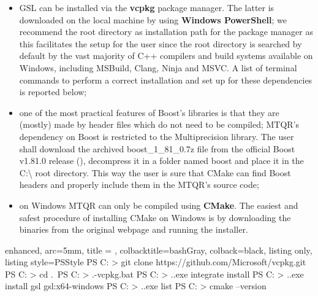 \documentclass[a4paper, twosided]{book}
\begin{document}
\begin{itemize}
    \item GSL can be installed via the \color{poliDarkBlue} \textbf{vcpkg} \color{black} package manager. The latter is downloaded on the local machine by using \color{poliDarkBlue} \textbf{Windows PowerShell}\color{black}; we recommend the root directory as installation path for the package manager as this facilitates the setup for the user since the root directory is searched by default by the vast majority of C++ compilers and build systems available on Windows, including MSBuild, Clang, Ninja and MSVC. A list of terminal commands to perform a correct installation and set up for these dependencies is reported below;

    \item one of the most practical features of Boost's libraries is that they are (mostly) made by header files which do not need to be compiled; MTQR's dependency on Boost is restricted to the Multiprecision library. The user shall download the archived \colorbox{poliGrayBlue}{boost\_1\_81\_0.7z}  file from the official Boost v1.81.0 release (\cite{boost_release}), decompress it in a folder named \colorbox{poliGrayBlue}{boost} and place it in the \colorbox{poliGrayBlue}{C:\textbackslash} root directory. This way the user is sure that \colorbox{poliGrayBlue}{CMake} can find Boost headers and properly include them in the MTQR's source code;

    \item on Windows MTQR can only be compiled using \color{poliDarkBlue} \textbf{CMake}\color{black}. The easiest and safest procedure of installing CMake on Windows is by downloading the binaries from the original webpage \cite{cmake} and running the installer.
\end{itemize}

\begin{tcblisting}{enhanced,
                    arc=5mm,
                    title = \color{black}{\large \ttfamily Installation of third-party libraries (Windows)},
                    colbacktitle=bashGray,
                    colback=black,
                    listing only,
                    listing style=PSStyle}
PS C: > git clone https://github.com/Microsoft/vcpkg.git
PS C: > cd .\vcpkg\
PS C: > .\bootstrap-vcpkg.bat
PS C: > .\vcpkg.exe integrate install
PS C: > .\vcpkg.exe install gsl gsl:x64-windows
PS C: > .\vcpkg.exe list
PS C: > cmake --version
\end{tcblisting}
\vspace{0.3cm}
\end{document}
